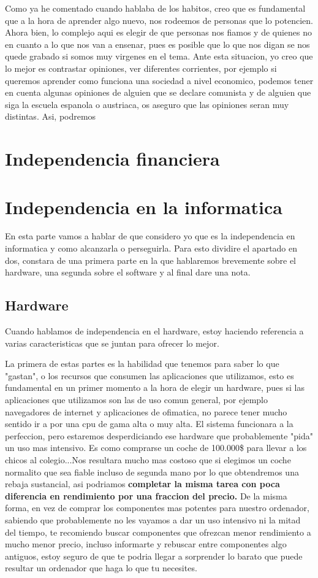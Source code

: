 Como ya he comentado cuando hablaba de los habitos, creo que es fundamental que a la hora de aprender algo nuevo, nos rodeemos de personas que lo potencien. Ahora bien, lo complejo aqui es elegir de que personas nos fiamos y de quienes no en cuanto a lo que nos van a ensenar, pues es posible que lo que nos digan se nos quede grabado si somos muy virgenes en el tema. Ante esta situacion, yo creo que lo mejor es contrastar opiniones, ver diferentes corrientes, por ejemplo si queremos aprender como funciona una sociedad a nivel economico, podemos tener en cuenta algunas opiniones de alguien que se declare comunista y de alguien que siga la escuela espanola o austriaca, os aseguro que las opiniones seran muy distintas. Asi, podremos 
\section{Independencia financiera}
\section{Independencia en la informatica}

En esta parte vamos a hablar de que considero yo que es la independencia en informatica y como alcanzarla o perseguirla. Para esto dividire el apartado en dos, constara de una primera parte en la que hablaremos brevemente sobre el hardware, una segunda sobre el software y al final dare una nota.

\subsection{ Hardware }

Cuando hablamos de independencia en el hardware, estoy haciendo referencia a varias caracteristicas que se juntan para ofrecer lo mejor. 

La primera de estas partes es la habilidad que tenemos para saber lo que "gastan", o los recursos que consumen las aplicaciones que utilizamos, esto es fundamental en un primer momento a la hora de elegir un hardware, pues si las aplicaciones que utilizamos son las de uso comun general, por ejemplo navegadores de internet y aplicaciones de ofimatica, no parece tener mucho sentido ir a por una cpu de gama alta o muy alta. El sistema funcionara a la perfeccion, pero estaremos desperdiciando ese hardware que probablemente "pida" un uso mas intensivo. Es como comprarse un coche de 100.000\$ para llevar a los chicos al colegio...Nos resultara mucho mas costoso que si elegimos un coche normalito que sea fiable incluso de segunda mano por lo que obtendremos una rebaja sustancial, asi podriamos \textbf{ completar la misma tarea con poca diferencia en rendimiento por una fraccion del precio. } De la misma forma, en vez de comprar los componentes mas potentes para nuestro ordenador, sabiendo que probablemente no les vayamos a dar un uso intensivo ni la mitad del tiempo, te recomiendo buscar componentes que ofrezcan menor rendimiento a mucho menor precio, incluso informarte y rebuscar entre componentes algo antiguos, estoy seguro de que te podria llegar a sorprender lo barato que puede resultar un ordenador que haga lo que tu necesites.

